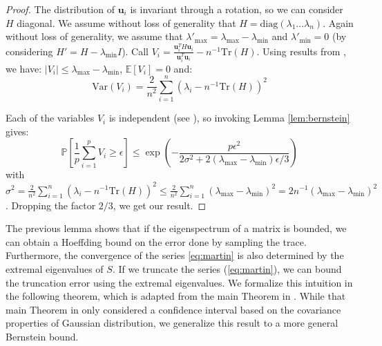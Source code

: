 \begin{proof} The distribution of $\mathbf{u}_{i}$ is invariant
through a rotation, so we can consider $H$ diagonal. We assume without
loss of generality that $H=\text{diag}\left(\lambda_{1}...\lambda_{n}\right)$.
Again without loss of generality, we assume that $\lambda'_{\max}=\lambda_{\max}-\lambda_{\min}$
and $\lambda'_{\min}=0$ (by considering $H'=H-\lambda_{\min}I$).
Call $V_{i}=\frac{\mathbf{u}_{i}^{T}H\mathbf{u}_{i}}{\mathbf{u}_{i}^{T}\mathbf{u}_{i}}-n^{-1}\text{Tr}\left(H\right)$.
Using results from \cite{Barry1999}, we have: $\left|V_{i}\right|\leq\lambda_{\max}-\lambda_{\min}$,
$\mathbb{E}\left[V_{i}\right]=0$ and: 
\[
\text{Var}\left(V_{i}\right)=\frac{2}{n^{2}}\sum_{i=1}^{n}\left(\lambda_{i}-n^{-1}\text{Tr}\left(H\right)\right)^{2}
\]


Each of the variables $V_{i}$ is independent (see \cite{Barry1999}),
so invoking Lemma \ref{lem:bernstein} gives: 
\[
\mathbb{P}\left[\frac{1}{p}\sum_{i=1}^{p}V_{i}\geq\epsilon\right]\leq\exp\left(-\frac{p\epsilon^{2}}{2\sigma^{2}+2\left(\lambda_{\max}-\lambda_{\min}\right)\epsilon/3}\right)
\]
with $\sigma^{2}=\frac{2}{n^{2}}\sum_{i=1}^{n}\left(\lambda_{i}-n^{-1}\text{Tr}\left(H\right)\right)^{2}\leq\frac{2}{n^{2}}\sum_{i=1}^{n}\left(\lambda_{\max}-\lambda_{\min}\right)^{2}=2n^{-1}\left(\lambda_{\max}-\lambda_{\min}\right)^{2}$.
Dropping the factor $2/3$, we get our result. \end{proof}

The previous lemma shows that if the eigenspectrum of a matrix is
bounded, we can obtain a Hoeffding bound on the error done by sampling
the trace. Furthermore, the convergence of the series \ref{eq:martin}
is also determined by the extremal eigenvalues of $S$. If we truncate
the series (\ref{eq:martin}), we can bound the truncation error using
the extremal eigenvalues. We formalize this intuition in the following
theorem, which is adapted from the main Theorem in \cite{Barry1999}.
While that main Theorem in \cite{Barry1999} only considered a confidence
interval based on the covariance properties of Gaussian distribution,
we generalize this result to a more general Bernstein bound.

